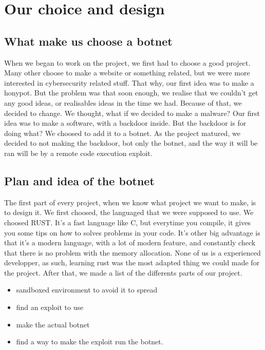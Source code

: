 \documentclass[../main.tex]{subfiles}
\begin{document}
	\chapter{Our choice and design}

    \section{What make us choose a botnet}

    When we began to work on the project, we first had to choose a good project.
    Many other choose to make a website or something related, but we were more interested in cybersecurity related stuff.
    That why, our first idea was to make a honypot.
    But the problem was that soon enough, we realise that we couldn't get any good ideas, or realisables ideas in the time we had.
    Because of that, we decided to change.
    We thought, what if we decided to make a malware?
    Our first idea was to make a software, with a backdoor inside.
    But the backdoor is for doing what?
    We choosed to add it to a botnet.
    As the project matured, we decided to not making the backdoor, bot only the botnet, and the way it will be ran will be by a remote code execution exploit. 


	\vspace{10pt}

    \section{Plan and idea of the botnet}

    The first part of every project, when we know what project we want to make, is to design it.
    We first choosed, the languaged that we were supposed to use.
    We choosed RUST.
    It's a fast language like C, but everytime you compile, it gives you some tips on how to solves problems in your code.
    It's other big advantage is that it's a modern language, with a lot of modern feature, and constantly check that there is no problem with the memory allocation.
    None of us is a experienced developper, as such, learning rust was the most adapted thing we could made for the project.
    After that, we made a list of the differents parts of our project.

    \begin{itemize}

        \item sandboxed environment to avoid it to spread

        \item find an exploit to use

        \item make the actual botnet

        \item find a way to make the exploit run the botnet.

    \end{itemize}
\end{document}
